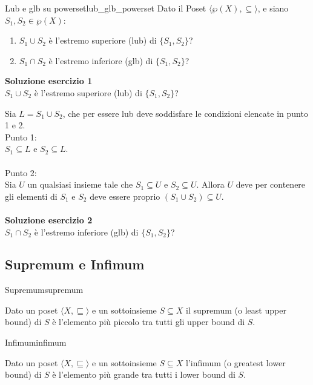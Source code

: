 \begin{esercizio}{Lub e glb su powerset}{lub_glb_powerset}
Dato il Poset $\langle \wp(X), \subseteq \rangle$, e siano $S_{1},S_{2}\in \wp(X)$:
\begin{enumerate}
    \item $S_{1}\cup S_{2}$ è l'estremo superiore (lub) di $\{S_{1},S_{2}\}$?
    \item $S_{1}\cap S_{2}$ è l'estremo inferiore (glb) di $\{S_{1},S_{2}\}$?
\end{enumerate}

\textbf{Soluzione esercizio 1}\\
$S_{1}\cup S_{2}$ è l'estremo superiore (lub) di $\{S_{1},S_{2}\}$?

Sia $L = S_1 \cup S_2$, che per essere lub deve soddisfare le condizioni elencate
in  punto 1 e 2.\\
Punto 1:\\
$S_1 \subseteq L$ e $S_2 \subseteq L$.\\
\\
Punto 2:\\
Sia $U$ un qualsiasi insieme tale che $S_1 \subseteq U$ e $S_2 \subseteq U$.
Allora $U$ deve per contenere gli elementi di $S_1$ e $S_2$ deve essere proprio
$(S_1 \cup S_2) \subseteq U$.\\
\\
\textbf{Soluzione esercizio 2}\\
$S_{1}\cap S_{2}$ è l'estremo inferiore (glb) di $\{S_{1},S_{2}\}$?

\end{esercizio}
\subsection{Supremum e Infimum}

\begin{definizione}{Supremum}{supremum}

Dato un poset $\langle X, \sqsubseteq \rangle$ e un sottoinsieme $S \subseteq X$
il supremum (o least upper bound) di $S$ è l'elemento più piccolo tra tutti gli
upper bound di $S$.

\end{definizione}

\begin{definizione}{Infimum}{infimum}

Dato un poset $\langle X, \sqsubseteq \rangle$ e un sottoinsieme $S \subseteq X$
l'infimum (o greatest lower bound) di $S$ è l'elemento più grande tra tutti i
lower bound di $S$.

\end{definizione}

